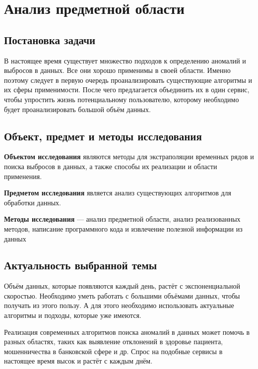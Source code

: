 \chapter{Анализ предметной области} \label{ch:ch1}

\section{Постановка задачи} \label{sec:ch1/sec1}

В настоящее время существует множество подходов к определению аномалий и выбросов в данных. Все они хорошо применимы в своей области. Именно поэтому следует в первую очередь проанализировать существующие алгоритмы и их сферы применимости. После чего предлагается объединить их в один сервис, чтобы упростить жизнь потенциальному пользователю, которому необходимо будет проанализировать большой объём данных.

\clearpage

\section{Объект, предмет и методы исследования} \label{sec:ch1/sec2}

\textbf{Объектом исследования} являются методы для экстраполяции временных рядов и поиска выбросов в данных, а также способы их реализации и области применения.

\textbf{Предметом исследования} является анализ существующих алгоритмов для обработки данных.

\textbf{Методы исследования} — анализ предметной области, анализ реализованных методов, написание программного кода и извлечение полезной информации из данных

\clearpage

\section{Актуальность выбранной темы} \label{sec:ch1/sec3}

Объём данных, которые появляются каждый день, растёт с экспоненциальной скоростью. Необходимо уметь работать с большими объёмами данных, чтобы получать из этого пользу. А для этого необходимо использовать актуальные алгоритмы и подходы, которые уже имеются.

Реализация современных алгоритмов поиска аномалий в данных может помочь в разных областях, таких как выявление отклонений в здоровье пациента, мошенничества в банковской сфере и др. Спрос на подобные сервисы в настоящее время высок и растёт с каждым днём.

\clearpage